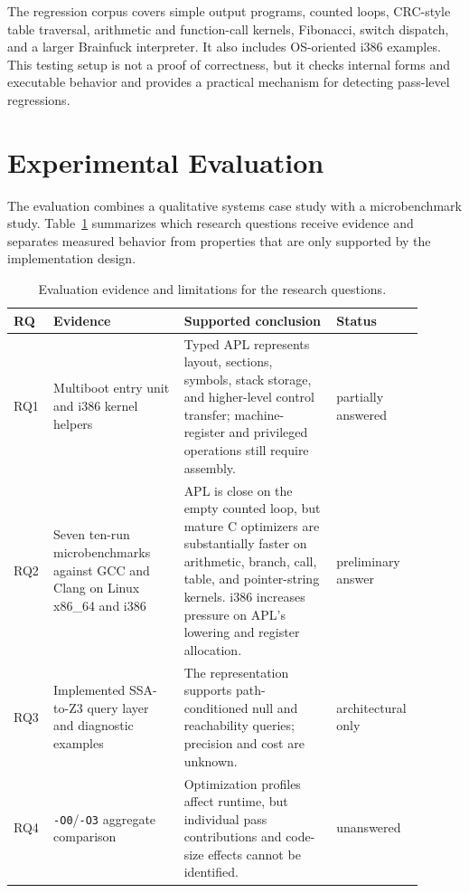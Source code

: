 \documentclass[10pt,twocolumn]{article}
\begin{document}
\par The regression corpus covers simple output programs, counted loops, CRC-style table traversal, arithmetic and function-call kernels, Fibonacci, switch dispatch, and a larger Brainfuck interpreter. It also includes OS-oriented i386 examples. This testing setup is not a proof of correctness, but it checks internal forms and executable behavior and provides a practical mechanism for detecting pass-level regressions.

\section{Experimental Evaluation}
\label{sec:evaluation}

\par The evaluation combines a qualitative systems case study with a microbenchmark study. Table~\ref{tab:rq-evidence} summarizes which research questions receive evidence and separates measured behavior from properties that are only supported by the implementation design.

\begin{table}[t]
\centering
\caption{Evaluation evidence and limitations for the research questions.}
\label{tab:rq-evidence}
\begin{tabular}{p{0.08\linewidth}p{0.30\linewidth}p{0.35\linewidth}p{0.17\linewidth}}
\toprule
RQ & Evidence & Supported conclusion & Status \\
\midrule
RQ1 & Multiboot entry unit and i386 kernel helpers & Typed APL represents layout, sections, symbols, stack storage, and higher-level control transfer; machine-register and privileged operations still require assembly. & partially answered \\
RQ2 & Seven ten-run microbenchmarks against GCC and Clang on Linux x86\_64 and i386 & APL is close on the empty counted loop, but mature C optimizers are substantially faster on arithmetic, branch, call, table, and pointer-string kernels. i386 increases pressure on APL's lowering and register allocation. & preliminary answer \\
RQ3 & Implemented SSA-to-Z3 query layer and diagnostic examples & The representation supports path-conditioned null and reachability queries; precision and cost are unknown. & architectural only \\
RQ4 & \texttt{-O0}/\texttt{-O3} aggregate comparison & Optimization profiles affect runtime, but individual pass contributions and code-size effects cannot be identified. & unanswered \\
\bottomrule
\end{tabular}
\end{table}
\end{document}
